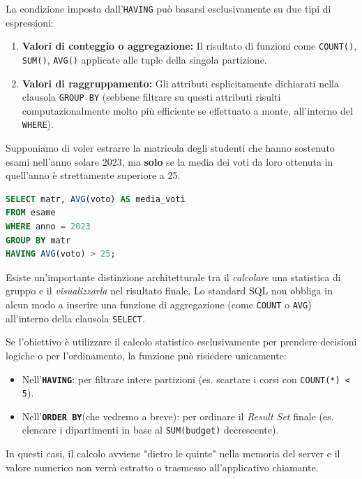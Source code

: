 La condizione imposta dall'\texttt{HAVING} può basarsi esclusivamente su due tipi di espressioni:
\begin{enumerate}
    \item \textbf{Valori di conteggio o aggregazione:} Il risultato di funzioni come \texttt{COUNT()}, \texttt{SUM()}, \texttt{AVG()} applicate alle tuple della singola partizione.
    \item \textbf{Valori di raggruppamento:} Gli attributi esplicitamente dichiarati nella clausola \texttt{GROUP BY} (sebbene filtrare su questi attributi risulti computazionalmente molto più efficiente se effettuato a monte, all'interno del \texttt{WHERE}).
\end{enumerate}

\begin{example}
Supponiamo di voler estrarre la matricola degli studenti che hanno sostenuto esami nell'anno solare 2023, ma \textbf{solo} se la media dei voti da loro ottenuta in quell'anno è strettamente superiore a 25.

\begin{lstlisting}[language=SQL, basicstyle=\ttfamily\small, keywordstyle=\color{blue}\bfseries]
SELECT matr, AVG(voto) AS media_voti
FROM esame
WHERE anno = 2023
GROUP BY matr
HAVING AVG(voto) > 25;
\end{lstlisting}

\end{example}

\begin{observation}
Esiste un'importante distinzione architetturale tra il \textit{calcolare} una statistica di gruppo e il \textit{visualizzarla} nel risultato finale. Lo standard SQL non obbliga in alcun modo a inserire una funzione di aggregazione (come \texttt{COUNT} o \texttt{AVG}) all'interno della clausola \texttt{SELECT}.

Se l'obiettivo è utilizzare il calcolo statistico esclusivamente per prendere decisioni logiche o per l'ordinamento, la funzione può risiedere unicamente:
\begin{itemize}
    \item Nell'\textbf{\texttt{HAVING}}: per filtrare intere partizioni (es. scartare i corsi con \texttt{COUNT(*) < 5}).
    \item Nell'\textbf{\texttt{ORDER BY}}(che vedremo a breve): per ordinare il \textit{Result Set} finale (es. elencare i dipartimenti in base al \texttt{SUM(budget)} decrescente).
\end{itemize}
In questi casi, il calcolo avviene "dietro le quinte" nella memoria del server e il valore numerico non verrà estratto o trasmesso all'applicativo chiamante.
\end{observation}

